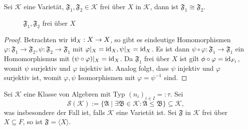 \begin{proposition}
    Sei $\mathcal{K}$ eine Varietät, $\mathfrak{F}_1, \mathfrak{F}_2 \in \mathcal{K}$ frei über $X$ in $\mathcal{K}$, dann ist $\mathfrak{F}_1 \cong \mathfrak{F}_2$.
\end{proposition}

\begin{figure}[H]
    \centering
    \caption{$\mathfrak{F}_1, \mathfrak{F}_2$ frei über $X$}
\end{figure}

\begin{proof}
    Betrachten wir $\operatorname{id}_X : X \to X$, so gibt es eindeutige Homomorphismen $\varphi : \mathfrak{F}_1 \to \mathfrak{F}_2, \psi : \mathfrak{F}_2 \to \mathfrak{F}_1$ mit $\varphi \vert_X = \operatorname{id}_X, \psi \vert_X = \operatorname{id}_X$. Es ist dann $\psi \circ \varphi : \mathfrak{F}_1 \to \mathfrak{F}_1$ ein Homomorphismus mit $(\psi \circ \varphi) \vert_X = \operatorname{id}_X$. Da $\mathfrak{F}_1$ frei über $X$ ist gilt $\phi \circ \varphi = \operatorname{id}_{F_1}$, womit $\psi$ surjektiv und $\varphi$ injektiv ist. Analog folgt, dass $\psi$ injektiv und $\varphi$ surjektiv ist, womit $\varphi, \psi$ Isomorphismen mit $\varphi = \psi^{-1}$ sind.
\end{proof}


\begin{proposition}
    Sei $\mathcal{K}$ eine Klasse von Algebren mit Typ $(n_i)_{i \in I} =: \tau$. Sei
    $$ \mathcal{S}(\mathcal{K}) := \{ \mathfrak{A} \mid \exists \mathfrak{B} \in \mathcal{K}: \mathfrak{A} \leq \mathfrak{B} \} \subseteq \mathcal{K}, $$
    was insbesondere der Fall ist, falls $\mathcal{K}$ eine Varietät ist. Sei $\mathfrak{F}$ in $\mathcal{K}$ frei über $X \subseteq F$, so ist $\mathfrak{F} = \langle X \rangle$.
\end{proposition}


